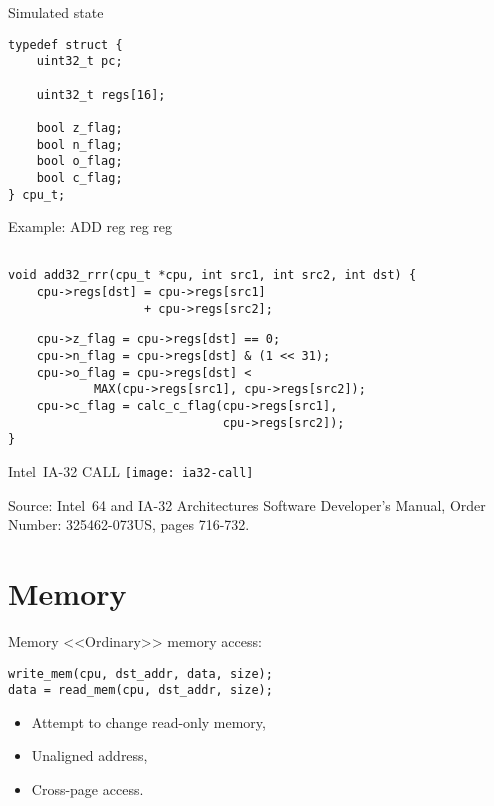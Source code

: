 \begin{frame}[fragile]{Simulated state}
\begin{lstlisting}
typedef struct {
    uint32_t pc;

    uint32_t regs[16];

    bool z_flag;
    bool n_flag;
    bool o_flag;
    bool c_flag;
} cpu_t;
\end{lstlisting}
\end{frame}


\begin{frame}[fragile]{Example: ADD reg reg reg}
\begin{lstlisting}

void add32_rrr(cpu_t *cpu, int src1, int src2, int dst) {
    cpu->regs[dst] = cpu->regs[src1]
                   + cpu->regs[src2];
\end{lstlisting}
\pause

\begin{lstlisting}
    cpu->z_flag = cpu->regs[dst] == 0;
    cpu->n_flag = cpu->regs[dst] & (1 << 31);
    cpu->o_flag = cpu->regs[dst] < 
            MAX(cpu->regs[src1], cpu->regs[src2]);
    cpu->c_flag = calc_c_flag(cpu->regs[src1],
                              cpu->regs[src2]);
}
\end{lstlisting}
\end{frame}

\begin{frame}{Intel\reg~IA-32 CALL}
\centering
\texttt{[image: ia32-call]}

\tiny{Source: Intel\reg~64 and IA-32 Architectures Software Developer’s Manual,
      Order Number: 325462-073US, pages 716-732.}
\end{frame}

\section{Memory}

\begin{frame}[fragile]{Memory}
<<Ordinary>> memory access:
\vfill
\begin{lstlisting}
write_mem(cpu, dst_addr, data, size);
data = read_mem(cpu, dst_addr, size);
\end{lstlisting}
\pause\vfill
\begin{itemize}
\item Attempt to change read-only memory,
\item Unaligned address,
\item Cross-page access.
\end{itemize}
\end{frame}

